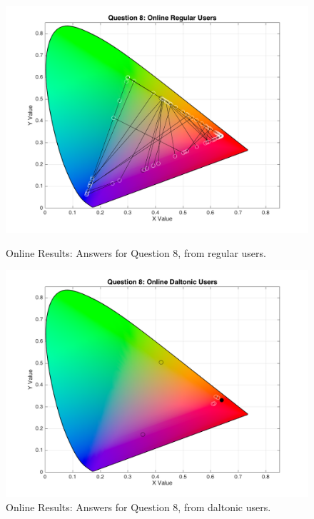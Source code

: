 \begin{figure}[!htbp]
  \centering
  \begin{minipage}{0.48\textwidth}
    \centering
    \includegraphics[width=\textwidth]{images/results/8_online_regularUsers.png}
    \caption[Online Results: Answers for Question 8, from regular users.]{Online Results: Answers for Question 8, from regular users.}
    \label{fig:dalt_1}
  \end{minipage}\hfill
  \begin{minipage}{0.48\textwidth}
    \centering
    \includegraphics[width=\textwidth]{images/results/8_online_daltonicUsers.png}
    \caption[Online Results: Answers for Question 8, from daltonic users.]{Online Results: Answers for Question 8, from daltonic users.}
    \label{fig:dalt_2}
  \end{minipage}
\end{figure} \par
%
